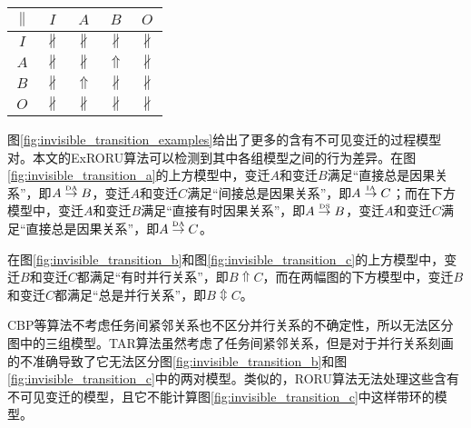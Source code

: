 \begin{table}[htbp]
\begin{subtable}{1\textwidth}
\begin{minipage}[b]{0.3\textwidth}
\begin{tabular}{|c|c|c|c|c|}
      \end{tabular}
    \end{minipage}
    \begin{minipage}[b]{0.3\textwidth}
      \centering
      \begin{tabular}{|c|c|c|c|c|} \hline
        $\parallel$ & $I$ & $A$ & $B$ & $O$\\ \hline
        $I$ & $\nparallel$ & $\nparallel$ & $\nparallel$ & $\nparallel$\\ \hline
        $A$ & $\nparallel$ & $\nparallel$ & $\Uparrow$ & $\nparallel$\\ \hline
        $B$ & $\nparallel$ & $\Uparrow$ & $\nparallel$ & $\nparallel$\\ \hline
        $O$ & $\nparallel$ & $\nparallel$ & $\nparallel$ & $\nparallel$\\ \hline
      \end{tabular}
    \end{minipage}
  \end{subtable}
\end{table}

图\ref{fig:invisible_transition_examples}给出了更多的含有不可见变迁的过程模型对。本文的ExRORU算法可以检测到其中各组模型之间的行为差异。在图\ref{fig:invisible_transition_a}的上方模型中，变迁$A$和变迁$B$满足“直接总是因果关系”，即$A\overset{\text{\tiny{DA}}}{\rightarrow}B$，变迁$A$和变迁$C$满足“间接总是因果关系”，即$A\overset{\text{\tiny{IA}}}{\rightarrow}C$；而在下方模型中，变迁$A$和变迁$B$满足“直接有时因果关系”，即$A\overset{\text{\tiny{DS}}}{\rightarrow}B$，变迁$A$和变迁$C$满足“直接总是因果关系”，即$A\overset{\text{\tiny{DA}}}{\rightarrow}C$。

在图\ref{fig:invisible_transition_b}和图\ref{fig:invisible_transition_c}的上方模型中，变迁$B$和变迁$C$都满足“有时并行关系”，即$B\Uparrow C$，而在两幅图的下方模型中，变迁$B$和变迁$C$都满足“总是并行关系”，即$B\Updownarrow C$。

CBP等算法不考虑任务间紧邻关系也不区分并行关系的不确定性，所以无法区分图中的三组模型。TAR算法虽然考虑了任务间紧邻关系，但是对于并行关系刻画的不准确导致了它无法区分图\ref{fig:invisible_transition_b}和图\ref{fig:invisible_transition_c}中的两对模型。类似的，RORU算法无法处理这些含有不可见变迁的模型，且它不能计算图\ref{fig:invisible_transition_c}中这样带环的模型。


